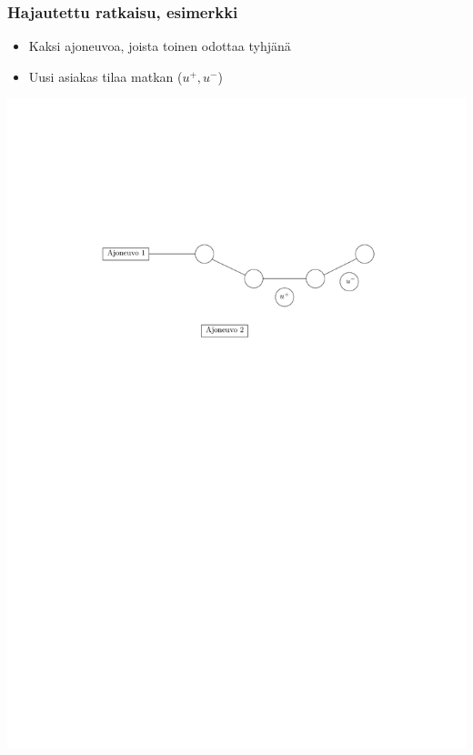 \documentclass{beamer}
\begin{document}
    
                    \begin{frame}
  \frametitle{Hajautettu ratkaisu, esimerkki}   %
\begin{minipage}[t][0.3\textheight][t]{\textwidth}
  \begin{itemize}
 \item 
 Kaksi ajoneuvoa, joista toinen odottaa tyhjänä
   \item 
 Uusi asiakas tilaa matkan ($u^+,u^-$)
\end{itemize}
  \end{minipage}
  \vfill
  \begin{minipage}{\textwidth}
    \centering
\includegraphics[scale=0.6]{valinta02}
  \end{minipage}
  
  \end{frame}
    
\end{document}
